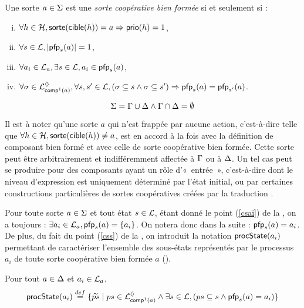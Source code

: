 \begin{definition}
  Une sorte $a \in \PHs$ est une \emph{sorte coopérative bien formée} si et seulement si :
  \begin{enumerate}[(i)]
    \item $\forall h \in \PHh, \sort{\target{h}} = a \Rightarrow \prio(h) = 1$,
    \item \label{csai} $\forall s \in \PHl, \card{\pfp_s(a)} = 1$,
    \item \label{css} $\forall a_i \in \PHl_a, \exists s \in \PHl, a_i \in \pfp_s(a)$,
    \item $\forall \mysigma \in \PHsubl[\PHl]_{\compin(a)}, \forall s, s' \in \PHl,
        (\mysigma \subseteq s \wedge \mysigma \subseteq s') \Rightarrow \pfp_s(a) = \pfp_{s'}(a)$.
  \end{enumerate}
\end{definition}

\begin{condition}
  \[\PHs = \components \cup \cs \wedge \components \cap \cs = \emptyset\]
\end{condition}

Il est à noter qu'une sorte $a$ qui n'est frappée par aucune action,
c'est-à-dire telle que $\forall h \in \PHh, \sort{\target{h}} \neq a$,
est en accord à la fois avec la définition de composant bien formé
et avec celle de sorte coopérative bien formée.
Cette sorte peut être arbitrairement et indifféremment affectée à $\components$ ou à $\cs$.
Un tel cas peut se produire pour des composants ayant un rôle d'«~entrée~»,
c'est-à-dire dont le niveau d'expression est uniquement déterminé par l'état initial,
ou par certaines constructions particulières de sortes coopératives créées par la traduction
.

Pour toute sorte $a \in \PHs$ et tout état $s \in \PHl$,
étant donné le point (\ref{csai}) de la , on a toujours :
$\exists a_i \in \PHl_a, \pfp_s(a) = \{ a_i \}$.
On notera donc dans la suite : $\pfp_s(a) = a_i$.
De plus, du fait du point (\ref{css}) de la , on introduit la notation
$\csState(a_i)$ permettant de caractériser l'ensemble des sous-états représentés par le
processus $a_i$ de toute sorte coopérative bien formée $a$ ().

\begin{definition}[$\csState : \PHproc \rightarrow \powerset(\PHproc)$]
\label{def:csState}
  Pour tout $a \in \cs$ et $a_i \in \PHl_a$, 
    \[\csState(a_i) \DEF \{ \toset{ps} \mid ps \in \PHsubl[\PHl]_{\compin(a)} \wedge
      \exists s \in \PHl, (ps \subseteq s \wedge \pfp_s(a) = a_i) \}\]
\end{definition}

